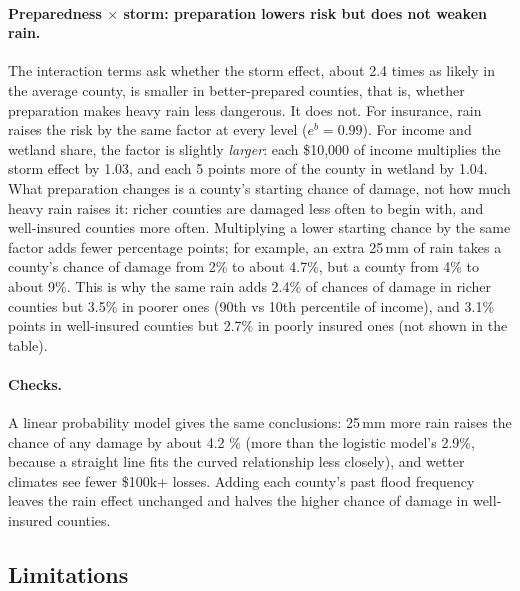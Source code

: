 \documentclass[10pt,twocolumn]{article}
\begin{document}
\paragraph{Preparedness $\times$ storm: preparation lowers risk but does not weaken rain.} The
interaction terms ask whether the storm effect, about 2.4 times as likely in the average county,
is smaller in better-prepared counties, that is, whether preparation makes heavy rain less
dangerous. It does not. For insurance, rain raises the risk by the same factor at every
level ($e^b = 0.99$). For income and wetland share, the factor is slightly \emph{larger}: each
\$10{,}000 of income multiplies the storm effect by 1.03, and each 5 points more of the county in wetland by 1.04.
What preparation changes is a county's starting chance of damage, not how much heavy rain raises
it: richer counties are damaged less often to begin with, and well-insured counties more often.
Multiplying a lower starting chance by the same factor adds fewer percentage points; for example,
an extra 25\,mm of rain takes a county's chance of damage from 2\% to about 4.7\%, but a county from 4\% to about 9\%.
This is why the same rain adds 2.4\% of chances of damage in richer counties but 3.5\% in poorer ones (90th vs 10th
percentile of income), and 3.1\% points in well-insured counties but 2.7\% in poorly insured ones
(not shown in the table).

\paragraph{Checks.} A linear probability model gives the same conclusions: 25\,mm more rain raises
the chance of any damage by about 4.2 \% (more than the logistic model's 2.9\%, because a straight line fits the curved relationship less closely), and wetter climates see fewer \$100k+ losses. Adding each county's past flood frequency leaves the rain effect unchanged and halves the higher chance of damage in well-insured counties.


\subsection{Limitations}
\end{document}
